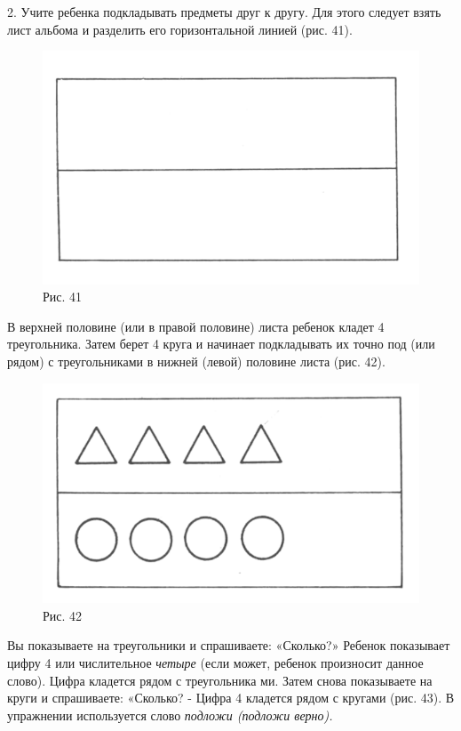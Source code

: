 \documentclass[a5paper]{book}
\renewcommand{\emph}[1]{\textit{#1}}
\begin{document}
2. Учите ребенка подкладывать предметы друг к другу. Для этого следует
взять лист альбома и разделить его горизонтальной линией (рис. 41).

\begin{figure}
\centering
\includegraphics[width=\linewidth]{media/media/image37.png}
\caption*{Рис. 41}
\end{figure}

В верхней половине (или в правой половине) листа ребенок кладет 4
треугольника. Затем берет 4 круга и начинает подкладывать их точно под
(или рядом) с треугольниками в нижней (левой) половине листа (рис. 42).

\begin{figure}
\centering
\includegraphics[width=\linewidth]{media/media/image38.png}
\caption*{Рис. 42}
\end{figure}

Вы показываете на треугольники и спрашиваете: «Сколько?» Ребенок
показывает цифру 4 или числительное \emph{четыре} (если может, ребенок
произносит данное слово). Цифра кладется рядом с треугольника ми. Затем
снова показываете на круги и спрашиваете: «Сколько? - Цифра 4 кладется
рядом с кругами (рис. 43). В упражнении используется слово \emph{подложи
(подложи верно).}
\end{document}

